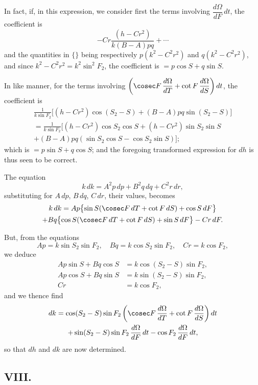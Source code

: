 \documentclass[11pt,a4paper]{book}
\begin{document}
{{In fact, if, in this expression, we consider first the terms involving $\dfrac{d\Omega}{dF}\,dt$, the coefficient is
\[
-Cr\frac{(h-Cr^2)}{k(B-A)pq} + \cdots
\]
and the quantities in $\{\}$ being respectively $p(k^2-C^2r^2)$ and $q(k^2-C^2r^2)$, and since $k^2 - C^2r^2 = k^2\sin^2 F_2$, the coefficient is $= p\cos S + q\sin S$.

In like manner, for the terms involving $\left(\cosec F\,\dfrac{d\Omega}{dT} + \cot F\,\dfrac{d\Omega}{dS}\right)dt$, the coefficient is
\begin{multline*}
\frac{1}{k\sin F_2}\bigl[(h-Cr^2)\cos(S_2-S) + (B-A)pq\sin(S_2-S)\bigr] \\
= \frac{1}{k\sin F_2}\bigl[(h-Cr^2)\cos S_2\cos S + (h-Cr^2)\sin S_2\sin S \\
+ (B-A)pq(\sin S_2\cos S - \cos S_2\sin S)\bigr];
\end{multline*}
which is $= p\sin S + q\cos S$; and the foregoing transformed expression for $dh$ is thus seen to be correct.

The equation
\[
k\,dk = A^2p\,dp + B^2q\,dq + C^2r\,dr,
\]
substituting for $A\,dp$, $B\,dq$, $C\,dr$, their values, becomes
\begin{multline*}
k\,dk = Ap\bigl\{\sin S(\cosec F\,dT + \cot F\,dS) + \cos S\,dF\bigr\} \\
+ Bq\bigl\{\cos S(\cosec F\,dT + \cot F\,dS) + \sin S\,dF\bigr\} - Cr\,dF.
\end{multline*}

But, from the equations
\[
Ap = k\sin S_2\sin F_2, \quad Bq = k\cos S_2\sin F_2, \quad Cr = k\cos F_2,
\]
we deduce
\begin{align*}
Ap\sin S + Bq\cos S &= k\cos(S_2-S)\sin F_2, \\
Ap\cos S + Bq\sin S &= k\sin(S_2-S)\sin F_2, \\
Cr &= k\cos F_2,
\end{align*}
and we thence find
\begin{multline}
dk = \cos(S_2-S)\sin F_2\left(\cosec F\,\frac{d\Omega}{dT} + \cot F\,\frac{d\Omega}{dS}\right)dt \notag\\
+ \sin(S_2-S)\sin F_2\,\frac{d\Omega}{dF}\,dt - \cos F_2\,\frac{d\Omega}{dF}\,dt,
\end{multline}
so that $dh$ and $dk$ are now determined.

\subsection*{VIII.}

}}
\end{document}
